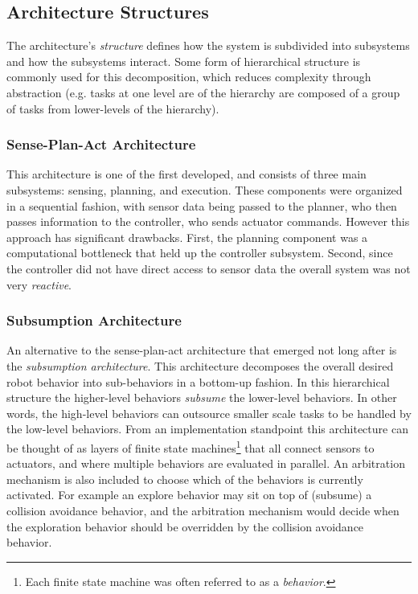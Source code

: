 \subsection{Architecture Structures}
The architecture's \textit{structure} defines how the system is subdivided into subsystems and how the subsystems interact. Some form of hierarchical structure is commonly used for this decomposition, which reduces complexity through abstraction (e.g. tasks at one level are of the hierarchy are composed of a group of tasks from lower-levels of the hierarchy).

\subsubsection{Sense-Plan-Act Architecture}
This architecture is one of the first developed, and consists of three main subsystems: sensing, planning, and execution. These components were organized in a sequential fashion, with sensor data being passed to the planner, who then passes information to the controller, who sends actuator commands. However this approach has significant drawbacks. First, the planning component was a computational bottleneck that held up the controller subsystem. Second, since the controller did not have direct access to sensor data the overall system was not very \textit{reactive}.

\subsubsection{Subsumption Architecture}
An alternative to the sense-plan-act architecture that emerged not long after is the \textit{subsumption architecture}\cite{Brooks1986}. This architecture decomposes the overall desired robot behavior into sub-behaviors in a bottom-up fashion. In this hierarchical structure the higher-level behaviors \textit{subsume} the lower-level behaviors. In other words, the high-level behaviors can outsource smaller scale tasks to be handled by the low-level behaviors. 
From an implementation standpoint this architecture can be thought of as layers of finite state machines\footnote{Each finite state machine was often referred to as a \textit{behavior}.} that all connect sensors to actuators, and where multiple behaviors are evaluated in parallel. An arbitration mechanism is also included to choose which of the behaviors is currently activated. For example an explore behavior may sit on top of (subsume) a collision avoidance behavior, and the arbitration mechanism would decide when the exploration behavior should be overridden by the collision avoidance behavior.


